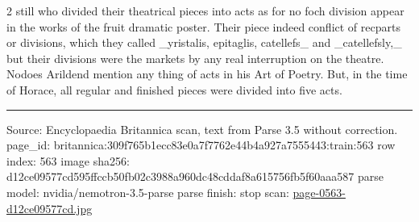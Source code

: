 \documentclass[10pt]{article}
\begin{document}
\begin{multicols}{2}
still who divided their theatrical pieces into acts as for no foch division appear in the works of the fruit dramatic poster. Their piece indeed conflict of recparts or divisions, which they called \_yristalis, epitaglis, catellefs\_ and \_catellefsly,\_ but their divisions were the markets by any real interruption on the theatre. Nodoes Arildend mention any thing of acts in his Art of Poetry. But, in the time of Horace, all regular and finished pieces were divided into five acts.

\end{multicols}
\vfill\par\noindent\rule{\linewidth}{0.4pt}\par
{\scriptsize\color{gray}\noindent Source: Encyclopaedia Britannica scan, text from Parse 3.5 without correction. page\_id: britannica:309f765b1ecc83e0a7f7762e44b4a927a7555443:train:563 \quad row index: 563 \quad image sha256: d12ce09577cd595ffccb50fb02c3988a960dc48cddaf8a615756fb5f60aaa587 \quad parse model: nvidia/nemotron-3.5-parse \quad parse finish: stop \quad scan: \href{../scans/page-0563-d12ce09577cd.jpg}{page-0563-d12ce09577cd.jpg}\par}
\end{document}
